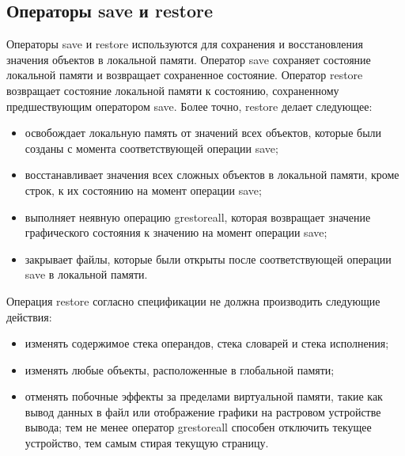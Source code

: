 \documentclass[14pt]{extarticle}
\begin{document}
\subsection{Операторы save и restore}
Операторы save и restore используются для сохранения и восстановления значения объектов в локальной памяти. Оператор save сохраняет состояние локальной памяти и возвращает сохраненное состояние. Оператор restore возвращает состояние локальной памяти к состоянию, сохраненному предшествующим оператором save. Более точно, restore делает следующее:
\begin{itemize}
\item освобождает локальную память от значений всех объектов, которые были созданы с момента соответствующей операции save;
\item восстанавливает значения всех сложных объектов в локальной памяти, кроме строк, к их состоянию на момент операции save;
\item выполняет неявную операцию grestoreall, которая возвращает значение графического состояния к значению на момент операции save;
\item закрывает файлы, которые были открыты после соответствующей операции save в локальной памяти.
\end{itemize}

Операция restore согласно спецификации не должна производить следующие действия:
\begin{itemize}
\item изменять содержимое стека операндов, стека словарей и стека исполнения; 
\item изменять любые объекты, расположенные в глобальной памяти;
\item отменять побочные эффекты за пределами виртуальной памяти, такие как вывод данных в файл или отображение графики на растровом устройстве вывода; тем не менее оператор grestoreall способен отключить текущее устройство, тем самым стирая текущую страницу.
\end{itemize}
\end{document}
